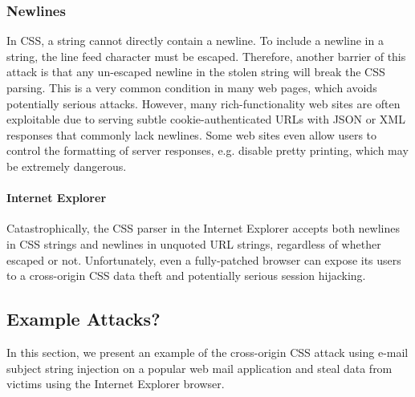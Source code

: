 \documentclass{acm_proc_article-sp}
\begin{document}
\subsubsection{Newlines}
In CSS, a string cannot directly contain a newline. To include a newline in a string, the line feed character must be escaped. Therefore, another barrier of this attack is that any un-escaped newline in the stolen string will break the CSS parsing. This is a very common condition in many web pages, which avoids potentially serious attacks. However, many rich-functionality web sites are often exploitable due to serving subtle cookie-authenticated URLs with JSON or XML responses that commonly lack newlines. Some web sites even allow users to control the formatting of server responses, e.g. disable pretty printing, which may be extremely dangerous.
\paragraph{Internet Explorer}
Catastrophically, the CSS parser in the Internet Explorer accepts both newlines in CSS strings and newlines in unquoted URL strings, regardless of whether escaped or not. Unfortunately, even a fully-patched browser can expose its users to a cross-origin CSS data theft and potentially serious session hijacking.

\subsection{Example Attacks?}
In this section, we present an example of the cross-origin CSS attack using e-mail subject string injection on a popular web mail application and steal data from victims using the Internet Explorer browser.
\end{document}

